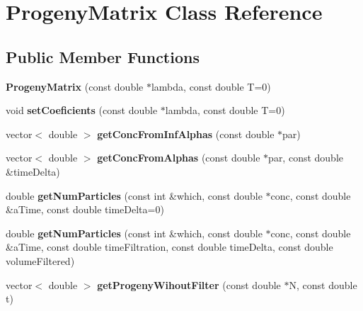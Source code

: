 \hypertarget{classProgenyMatrix}{\section{Progeny\-Matrix Class Reference}
\label{classProgenyMatrix}
}
\subsection*{Public Member Functions}
\begin{DoxyCompactItemize}
\item 
\hypertarget{classProgenyMatrix_a79232328f0be2c397ea9773c44f4913a}{{\bfseries Progeny\-Matrix} (const double $\ast$lambda, const double T=0)}\label{classProgenyMatrix_a79232328f0be2c397ea9773c44f4913a}

\item 
\hypertarget{classProgenyMatrix_a5fef82dcd5a0ff2b430852c92d407817}{void {\bfseries set\-Coeficients} (const double $\ast$lambda, const double T=0)}\label{classProgenyMatrix_a5fef82dcd5a0ff2b430852c92d407817}

\item 
\hypertarget{classProgenyMatrix_a0563a137e4337096eaebddad9cc1179b}{vector$<$ double $>$ {\bfseries get\-Conc\-From\-Inf\-Alphas} (const double $\ast$par)}\label{classProgenyMatrix_a0563a137e4337096eaebddad9cc1179b}

\item 
\hypertarget{classProgenyMatrix_ac4221da6b1d4a1c829aac5774260d516}{vector$<$ double $>$ {\bfseries get\-Conc\-From\-Alphas} (const double $\ast$par, const double \&time\-Delta)}\label{classProgenyMatrix_ac4221da6b1d4a1c829aac5774260d516}

\item 
\hypertarget{classProgenyMatrix_adf1b00db95a9dd67932e441ac9370970}{double {\bfseries get\-Num\-Particles} (const int \&which, const double $\ast$conc, const double \&a\-Time, const double time\-Delta=0)}\label{classProgenyMatrix_adf1b00db95a9dd67932e441ac9370970}

\item 
\hypertarget{classProgenyMatrix_ad7d7a8ff623daa4027af2f3380e34624}{double {\bfseries get\-Num\-Particles} (const int \&which, const double $\ast$conc, const double \&a\-Time, const double time\-Filtration, const double time\-Delta, const double volume\-Filtered)}\label{classProgenyMatrix_ad7d7a8ff623daa4027af2f3380e34624}

\item 
\hypertarget{classProgenyMatrix_adc511e5bb07ef655fb085b31232072b6}{vector$<$ double $>$ {\bfseries get\-Progeny\-Wihout\-Filter} (const double $\ast$N, const double t)}\label{classProgenyMatrix_adc511e5bb07ef655fb085b31232072b6}


\end{DoxyCompactItemize}
